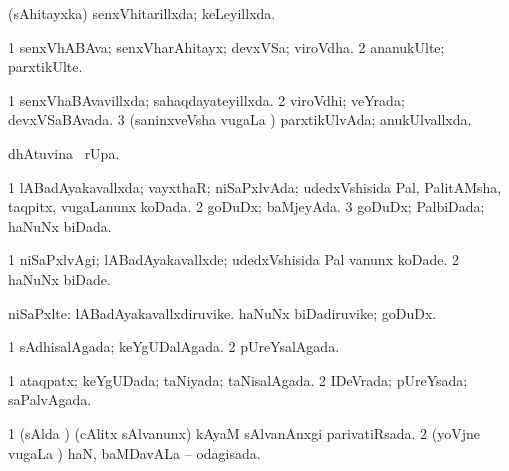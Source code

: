 {\bentry
{} 
\gl{\gu}
\expl{}
\bmng
 (sAhitayxka) senxVhitarillxda; keLeyillxda. 
\emng
\eentry

\bentry
{} 
\gl{\nA}
\expl{}
\bmng
\bnum
\num{1} senxVhABAva; senxVharAhitayx; devxVSa; viroVdha. 
\num{2} ananukUlte; parxtikUlte. 
\enum
\emng
\eentry

\bentry
{} 
\gl{\gu}
\bmng
\bnum
\num{1} senxVhaBAvavillxda; sahaqdayateyillxda. 
\num{2} viroVdhi; veYrada; devxVSaBAvada. 
\num{3} (saninxveVsha \mo vugaLa \vi) parxtikUlvAda; anukUlvallxda. 
\enum
\emng
\eentry

\bentry
{} 
\gl{\sakirx}
\expl{}
\bmng
\emng
\eentry

\bentry
{} 
\gl{\kirx}
\expl{}
\bmng
  dhAtuvina \BUkaq\ rUpa. 
\emng
\eentry

\bentry
{} 
\gl{\kirx}
\expl{}
\bmng
\emng
\eentry

\bentry
{} 
\gl{\gu}
\expl{}
\bmng
\bnum
\num{1} lABadAyakavallxda; vayxthaR; niSaPxlvAda; udedxVshisida Pal, PalitAMsha, taqpitx, \mo vugaLanunx koDada. 
\num{2} goDuDx; baMjeyAda. 
\num{3} goDuDx; PalbiDada; haNuNx biDada. 
\enum
\emng
\eentry

\bentry
{} 
\gl{\kirxvi}
\expl{}
\bmng
\bnum
\num{1} niSaPxlvAgi; lABadAyakavallxde; udedxVshisida Pal \mo vanunx koDade. 
\num{2} haNuNx biDade. 
\enum
\emng
\eentry

\bentry
{} 
\gl{\nA}
\expl{}
\bmng
 niSaPxlte: 
\banum
{} lABadAyakavallxdiruvike. 
 haNuNx biDadiruvike; goDuDx. 
\eanum
\emng
\eentry

\bentry
{} 
 \gl{\gu} \bmng
\bnum
\num{1} sAdhisalAgada; keYgUDalAgada. 
\num{2} pUreYsalAgada. 
\enum
\emng
\eentry

\bentry
{} 
\gl{\gu}
\expl{}
\bmng
\bnum
\num{1} ataqpatx; keYgUDada; taNiyada; taNisalAgada. 
\num{2} IDeVrada; pUreYsada; saPalvAgada. 
\enum
\emng
\eentry

\bentry
{} 
\gl{\gu}
\expl{}
\bmng
\bnum
\num{1} (sAlda \vi) (cAlitx sAlvanunx) kAyaM sAlvanAnxgi parivatiRsada. 
\num{2} (yoVjne \mo vugaLa \vi) haN, baMDavALa -- odagisada. 
\enum
\emng
\eentry

}
